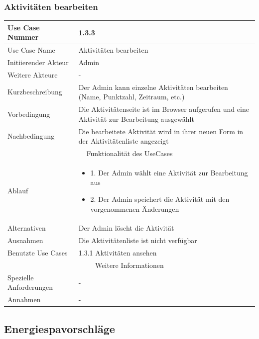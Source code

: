 \documentclass[10pt,a4paper]{article}
\begin{document}
	\subsubsection{Aktivit\"aten bearbeiten}
	\begin{tabular}{|l|p{.5\linewidth}|}
	\hline Use Case Nummer & 1.3.3 \\ 
	\hline Use Case Name & Aktivit\"aten bearbeiten \\ 
	\hline Initiierender Akteur & Admin \\
	\hline Weitere Akteure & - \\
	\hline Kurzbeschreibung & Der Admin kann einzelne Aktivit\"aten bearbeiten (Name, Punktzahl, Zeitraum, etc.) \\
	\hline Vorbedingung & Die Aktivit\"atenseite ist im Browser aufgerufen und eine Aktivit\"at zur Bearbeitung ausgew\"ahlt \\
	\hline Nachbedingung & Die bearbeitete Aktivit\"at wird in ihrer neuen Form in der Aktivit\"atenliste angezeigt \\
	\hline \multicolumn{2}{|c|}{Funktionalität des UseCases}\\
	\hline Ablauf & \begin{itemize}
			\item 1. Der Admin w\"ahlt eine Aktivit\"at zur Bearbeitung aus
			\item 2. Der Admin speichert die Aktivit\"at mit den vorgenommenen \"Anderungen
		\end{itemize} \\
	\hline Alternativen & Der Admin l\"oscht die Aktivit\"at \\
	\hline Ausnahmen & Die Aktivit\"atenliste ist nicht verf\"ugbar \\
	\hline Benutzte Use Cases & 1.3.1 Aktivit\"aten ansehen \\
	\hline \multicolumn{2}{|c|}{Weitere Informationen} \\
	\hline Spezielle Anforderungen & - \\
	\hline Annahmen & - \\
	\hline
	\end{tabular} 
        \subsection{Energiespavorschl\"age}
        
\end{document}
